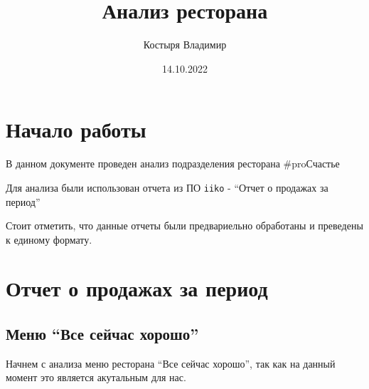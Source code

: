 \documentclass[
  letterpaper,
  DIV=11,
  numbers=noendperiod]{scrreport}
\title{Анализ ресторана}
\author{Костыря Владимир}
\date{14.10.2022}
\renewcommand*\contentsname{Table of contents}
\newcommand\contentsname{Table of contents}
\begin{document}
\maketitle
\ifdefined\Shaded\renewenvironment{Shaded}{\begin{tcolorbox}[sharp corners, breakable, interior hidden, enhanced, boxrule=0pt, borderline west={3pt}{0pt}{shadecolor}, frame hidden]}{\end{tcolorbox}}\fi

\renewcommand*\contentsname{Table of contents}
{
\hypersetup{linkcolor=}
\setcounter{tocdepth}{2}
\tableofcontents
}

\hypertarget{ux43dux430ux447ux430ux43bux43e-ux440ux430ux431ux43eux442ux44b}{%
\chapter*{Начало
работы}\label{ux43dux430ux447ux430ux43bux43e-ux440ux430ux431ux43eux442ux44b}}

В данном документе проведен анализ подразделения ресторана \#proСчастье

Для анализа были использован отчета из ПО \texttt{iiko} - ``Отчет о
продажах за период''

Стоит отметить, что данные отчеты были предвариельно обработаны и
преведены к единому формату.


\hypertarget{ux43eux442ux447ux435ux442-ux43e-ux43fux440ux43eux434ux430ux436ux430ux445-ux437ux430-ux43fux435ux440ux438ux43eux434}{%
\chapter{Отчет о продажах за
период}\label{ux43eux442ux447ux435ux442-ux43e-ux43fux440ux43eux434ux430ux436ux430ux445-ux437ux430-ux43fux435ux440ux438ux43eux434}}

\hypertarget{ux43cux435ux43dux44e-ux432ux441ux435-ux441ux435ux439ux447ux430ux441-ux445ux43eux440ux43eux448ux43e}{%
\section{Меню ``Все сейчас
хорошо''}\label{ux43cux435ux43dux44e-ux432ux441ux435-ux441ux435ux439ux447ux430ux441-ux445ux43eux440ux43eux448ux43e}}

Начнем с анализа меню ресторана ``Все сейчас хорошо'', так как на данный
момент это является акутальным для нас.
\end{document}
